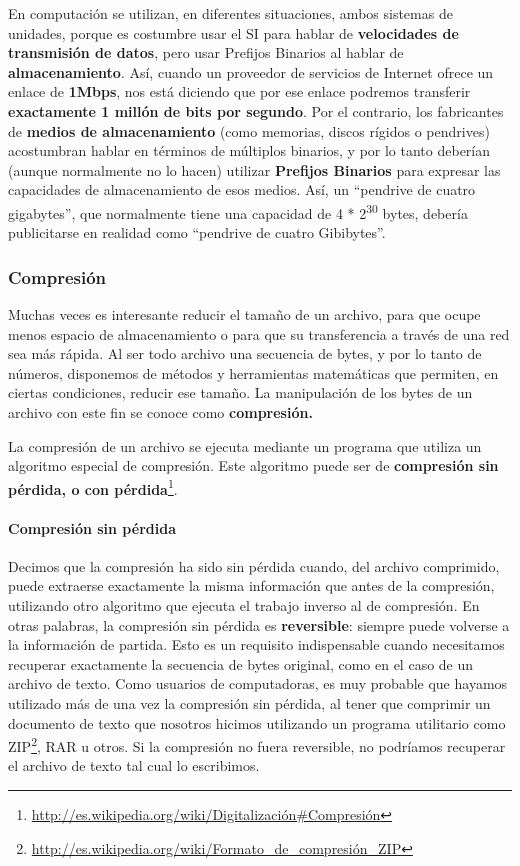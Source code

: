 \documentclass[a4paper]{article}
\begin{document}
En computación se utilizan, en diferentes situaciones, ambos sistemas
de unidades, porque es costumbre usar el SI para hablar de
\textbf{velocidades de transmisión de datos}, pero usar Prefijos
Binarios al hablar de \textbf{almacenamiento}. Así, cuando un
proveedor de servicios de Internet ofrece un enlace de \textbf{1Mbps},
nos está diciendo que por ese enlace podremos transferir
\textbf{exactamente 1 millón de bits por segundo}. Por el contrario,
los fabricantes de \textbf{medios de almacenamiento} (como memorias,
discos rígidos o pendrives) acostumbran hablar en términos de
múltiplos binarios, y por lo tanto deberían (aunque normalmente no
lo hacen) utilizar \textbf{Prefijos Binarios} para expresar las
capacidades de almacenamiento de esos medios. Así, un
{\textquotedblleft}pendrive de cuatro gigabytes{\textquotedblright},
que normalmente tiene una capacidad de 4 * 2\textsuperscript{30} bytes,
debería publicitarse en realidad como {\textquotedblleft}pendrive de
cuatro Gibibytes{\textquotedblright}. 

\subsubsection{Compresión}
Muchas veces es interesante reducir el tamaño de un archivo, para que
ocupe menos espacio de almacenamiento o para que su transferencia a
través de una red sea más rápida. Al ser todo archivo una
secuencia de bytes, y por lo tanto de números, disponemos de
métodos y herramientas matemáticas que permiten, en ciertas
condiciones, reducir ese tamaño. La manipulación de los bytes de un
archivo con este fin se conoce como \textbf{compresión.}

La compresión de un archivo se ejecuta mediante un programa que
utiliza un algoritmo especial de compresión. Este algoritmo puede ser
de \textbf{compresión sin pérdida, o con
pérdida}\footnote{\url{http://es.wikipedia.org/wiki/Digitalización\#Compresión}}.

\paragraph{Compresión sin pérdida}
Decimos que la compresión ha sido sin pérdida cuando, del archivo
comprimido, puede extraerse exactamente la misma información que
antes de la compresión, utilizando otro algoritmo que ejecuta el
trabajo inverso al de compresión. En otras palabras, la compresión
sin pérdida es \textbf{reversible}: siempre puede volverse a la
información de partida. Esto es un requisito indispensable cuando
necesitamos recuperar exactamente la secuencia de bytes original, como
en el caso de un archivo de texto. Como usuarios de computadoras, es
muy probable que hayamos utilizado más de una vez la compresión sin
pérdida, al tener que comprimir un documento de texto que nosotros
hicimos utilizando un programa utilitario como
ZIP\footnote{\url{http://es.wikipedia.org/wiki/Formato\_de\_compresión\_ZIP}},
RAR u otros. Si la compresión no fuera reversible, no podríamos
recuperar el archivo de texto tal cual lo escribimos.
\end{document}
